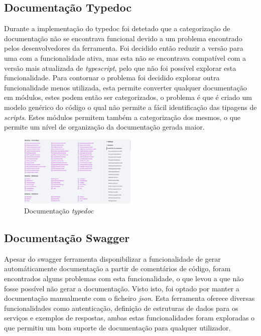 \subsection{Documentação Typedoc}
Durante a implementação do typedoc foi detetado que a categorização de documentação não se encontrava funcional devido a um problema encontrado pelos desenvolvedores da ferramenta. Foi decidido então reduzir a versão para uma com a funcionalidade ativa, mas esta não se encontrava compatível com a versão mais atualizada de \textit{typescript}, pelo que não foi possível explorar esta funcionalidade. Para contornar o problema foi decidido explorar outra funcionalidade menos utilizada, esta permite converter qualquer documentação em módulos, estes podem então ser categorizados, o problema é que é criado um modelo genérico do código o qual não permite a fácil identificação das tipagens de \textit{scripts}. Estes módulos permitem também a categorização dos mesmos, o que permite um nível de organização da documentação gerada maior.

\begin{figure}[htb]
  \centering
  \includegraphics[width=0.5\textwidth]{images/implementacao/api/docs.png}
  \caption{Documentação \textit{typedoc}}
  \label{type_doc}
\end{figure}

\newpage

\subsection{Documentação Swagger}
Apesar do swagger ferramenta disponibilizar a funcionalidade de gerar automáticamente documentação a partir de comentários de código, foram encontrados alguns problemas com esta funcionalidade, o que levou a que não fosse possível não gerar a documentação. Visto isto, foi optado por manter a documentação manualmente com o ficheiro \textit{json}. Esta ferramenta oferece diversas funcionalidades como autenticação, definição de estruturas de dados para os serviços e exemplos de respostas, ambas estas funcionalidades foram exploradas o que permitiu um bom suporte de documentação para qualquer utilizador.

